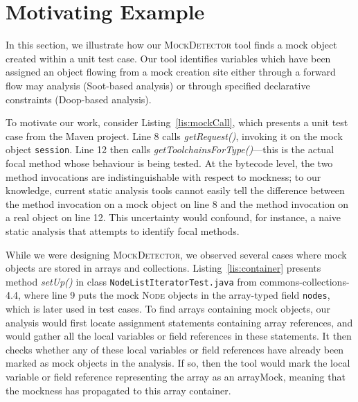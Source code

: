 \section{Motivating Example}
\label{sec:motivating-example}

In this section, we illustrate how our \textsc{MockDetector} tool finds a mock object created within a unit test case. Our tool identifies variables which have been assigned an object flowing from a mock creation site either through a forward flow may analysis (Soot-based analysis) or through specified declarative constraints (Doop-based analysis).


To motivate our work, consider Listing~\ref{lis:mockCall}, which presents a unit test case from the Maven project. Line 8 calls \textit{getRequest()}, invoking it on the mock object \texttt{session}. Line 12 then calls \textit{getToolchainsForType()}---this is the actual focal method whose behaviour is being tested. At the bytecode level, the two method invocations are indistinguishable with respect to mockness; to our knowledge, current static analysis tools cannot easily tell the difference between the method invocation on a mock object on line 8 and the method invocation on a real object on line 12. This uncertainty would confound, for instance, a naive static analysis that attempts to identify focal methods.

While we were designing \textsc{MockDetector}, we observed several cases where mock objects are stored in arrays and collections. Listing~\ref{lis:container} presents method \textit{setUp()} in class \texttt{NodeListIteratorTest.java} from commons-collections-4.4, where line 9 puts the mock \textsc{Node} objects in the array-typed field \texttt{nodes}, which is later used in test cases. To find arrays containing mock objects, our analysis would first locate assignment statements containing array references, and would gather all the local variables or field references in these statements. It then checks whether any of these local variables or field references have already been marked as mock objects in the analysis. If so, then the tool would mark the local variable or field reference representing the array as an arrayMock, meaning that the mockness has propagated to this array container. 


